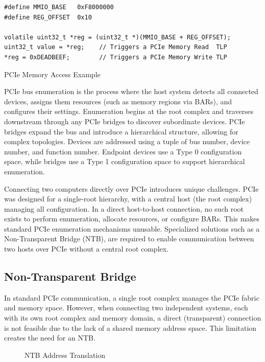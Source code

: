 \begin{listing}[H]
\begin{verbatim}
#define MMIO_BASE   0xF8000000
#define REG_OFFSET  0x10

volatile uint32_t *reg = (uint32_t *)(MMIO_BASE + REG_OFFSET);
uint32_t value = *reg;    // Triggers a PCIe Memory Read  TLP
*reg = 0xDEADBEEF;        // Triggers a PCIe Memory Write TLP
\end{verbatim}
\caption{PCIe Memory Access Example}
\end{listing}

PCIe bus enumeration is the process where the host system detects all connected devices, assigns them resources (such as memory regions via BARs), and configures their settings. Enumeration begins at the root complex and traverses downstream through any PCIe bridges to discover subordinate devices. PCIe bridges expand the bus and introduce a hierarchical structure, allowing for complex topologies. Devices are addressed using a tuple of bus number, device number, and function number. Endpoint devices use a Type 0 configuration space, while bridges use a Type 1 configuration space to support hierarchical enumeration.

Connecting two computers directly over PCIe introduces unique challenges. PCIe was designed for a single-root hierarchy, with a central host (the root complex) managing all configuration. In a direct host-to-host connection, no such root exists to perform enumeration, allocate resources, or configure BARs. This makes standard PCIe enumeration mechanisms unusable. Specialized solutions such as a Non-Transparent Bridge (NTB), are  required to enable communication between two hosts over PCIe without a central root complex.

\subsection{Non-Transparent Bridge}

In standard PCIe communication, a single root complex manages the PCIe fabric and memory space. However, when connecting two independent systems, each with its own root complex and memory domain, a direct (transparent) connection is not feasible due to the lack of a shared memory address space. This limitation creates the need for an NTB.

\begin{figure}[H]
    \centering
    
    \caption[NTB Address Translation]{NTB Address Translation}

    \label{fig:ntb}
\end{figure}

